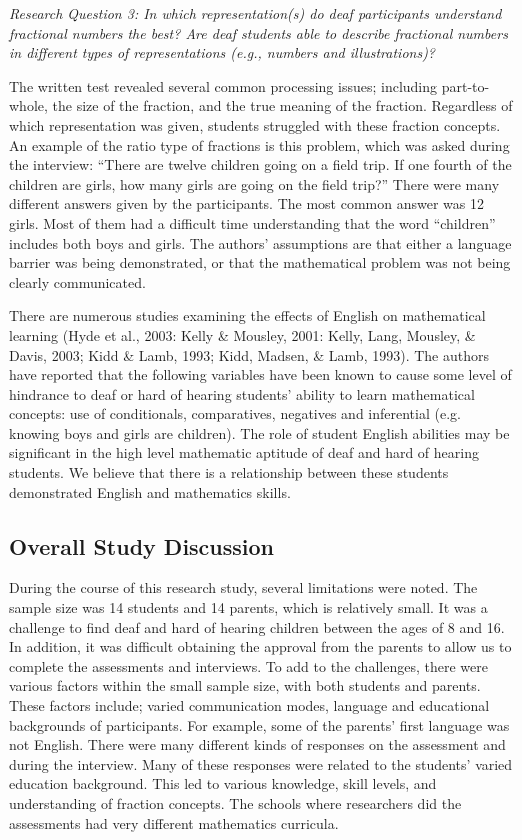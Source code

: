 \documentclass[11.5pt]{sig-alternate} %
\begin{document}
\begin{large}
\textit{Research Question 3: In which representation(s) do deaf participants understand fractional numbers the best? Are deaf students able to describe fractional numbers in different types of representations (e.g., numbers and illustrations)?}

The written test revealed several common processing issues; including part-to-whole, the size of the fraction, and the true meaning of the fraction. Regardless of which representation was given, students struggled with these fraction concepts. An example of the ratio type of fractions is this problem, which was asked during the interview: “There are twelve children going on a field trip. If one fourth of the children are girls, how many girls are going on the field trip?” There were many different answers given by the participants. The most common answer was 12 girls. Most of them had a difficult time understanding that the word “children” includes both boys and girls. The authors’ assumptions are that either a language barrier was being demonstrated, or that the mathematical problem was not being clearly communicated. 

There are numerous studies examining the effects of English on mathematical learning (Hyde et al., 2003: Kelly \& Mousley, 2001: Kelly, Lang, Mousley, \& Davis, 2003; Kidd \& Lamb, 1993; Kidd, Madsen, \& Lamb, 1993).  The authors have reported that the following variables have been known to cause some level of hindrance to deaf or hard of hearing students' ability to learn mathematical concepts: use of conditionals, comparatives, negatives and inferential (e.g. knowing boys and girls are children). The role of student English abilities may be significant in the high level mathematic aptitude of deaf and hard of hearing students. We believe that there is a relationship between these students demonstrated English and mathematics skills.

\subsection*{Overall Study Discussion}

During the course of this research study, several limitations were noted. The sample size was 14 students and 14 parents, which is relatively small. It was a challenge to find deaf and hard of hearing children between the ages of 8 and 16. In addition, it was difficult obtaining the approval from the parents to allow us to complete the assessments and interviews. To add to the challenges, there were various factors within the small sample size, with both students and parents. These factors include; varied communication modes, language and educational backgrounds of participants. For example, some of the parents’ first language was not English. There were many different kinds of responses on the assessment and during the interview. Many of these responses were related to the students’ varied education background. This led to various knowledge, skill levels, and understanding of fraction concepts. The schools where researchers did the assessments had very different mathematics curricula. 


\end{large}
\end{document}
